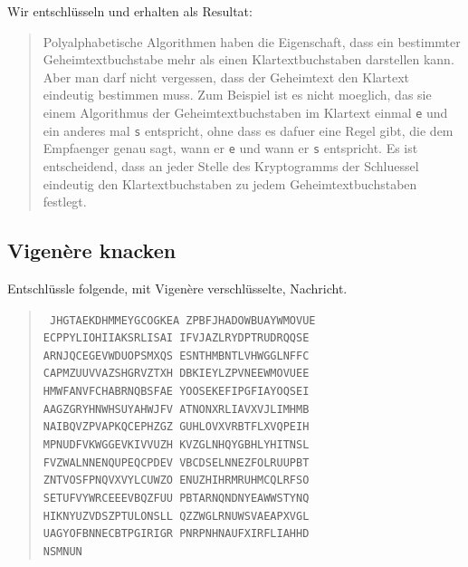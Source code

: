 \documentclass[%
11pt,%
twoside,%
titlepage,%
german,%
headsepline%
]{scrartcl}
\begin{document}
Wir entschlüsseln und erhalten als Resultat:
\begin{quote}
Polyalphabetische Algorithmen haben die Eigenschaft, dass ein bestimmter Geheimtextbuchstabe mehr als einen Klartextbuchstaben darstellen kann. Aber man darf nicht vergessen, dass der Geheimtext den Klartext eindeutig bestimmen muss. Zum Beispiel ist es nicht moeglich, das sie einem Algorithmus der Geheimtextbuchstaben im Klartext einmal \texttt{e} und ein anderes mal \texttt{s} entspricht, ohne dass es dafuer eine Regel gibt, die dem Empfaenger genau sagt, wann er \texttt{e} und wann er \texttt{s} entspricht. Es ist entscheidend, dass an jeder Stelle des Kryptogramms der Schluessel eindeutig den Klartextbuchstaben	zu jedem Geheimtextbuchstaben festlegt.
\end{quote}

\subsection{Vigen\`ere knacken}

Entschlüssle folgende, mit Vigen\`ere verschlüsselte, Nachricht.

\begin{quote}
\texttt{\Large
JHGTAEKDHMMEYGCOGKEA ZPBFJHADOWBUAYWMOVUE\\
ECPPYLIOHIIAKSRLISAI IFVJAZLRYDPTRUDRQQSE\\
ARNJQCEGEVWDUOPSMXQS ESNTHMBNTLVHWGGLNFFC\\
CAPMZUUVVAZSHGRVZTXH DBKIEYLZPVNEEWMOVUEE\\
HMWFANVFCHABRNQBSFAE YOOSEKEFIPGFIAYOQSEI\\
AAGZGRYHNWHSUYAHWJFV ATNONXRLIAVXVJLIMHMB\\
NAIBQVZPVAPKQCEPHZGZ GUHLOVXVRBTFLXVQPEIH\\
MPNUDFVKWGGEVKIVVUZH KVZGLNHQYGBHLYHITNSL\\
FVZWALNNENQUPEQCPDEV VBCDSELNNEZFOLRUUPBT\\
ZNTVOSFPNQVXVYLCUWZO ENUZHIHRMRUHMCQLRFSO\\
SETUFVYWRCEEEVBQZFUU PBTARNQNDNYEAWWSTYNQ\\
HIKNYUZVDSZPTULONSLL QZZWGLRNUWSVAEAPXVGL\\
UAGYOFBNNECBTPGIRIGR PNRPNHNAUFXIRFLIAHHD\\
NSMNUN
}
\end{quote}

\clearpage
\end{document}
